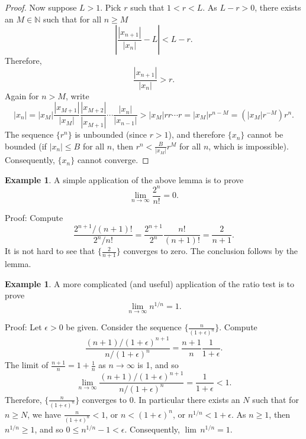 \documentclass[12pt]{book}
\newcommand{\abs}[1]{\left\lvert {#1} \right\rvert}
\newcommand{\N}{{\mathbb{N}}}
\theoremstyle{plain}
\theoremstyle{remark}
\theoremstyle{definition}
\theoremstyle{exercise}
\theoremstyle{example}
\newtheorem{example}[thm]{Example}
\begin{document}
\begin{proof}
Now suppose $L > 1$.  Pick
$r$ such that $1 < r < L$.  As $L-r > 0$,
there exists an $M \in \N$ such that for
all $n \geq M$
\begin{equation*}
\abs{\frac{\abs{x_{n+1}}}{\abs{x_n}} - L} < L-r .
\end{equation*}
Therefore,
\begin{equation*}
\frac{\abs{x_{n+1}}}{\abs{x_n}} > r .
\end{equation*}
Again for $n > M$,
write
\begin{equation*}
\abs{x_n} =
\abs{x_M}
\frac{\abs{x_{M+1}}}{\abs{x_{M}}}
\frac{\abs{x_{M+2}}}{\abs{x_{M+1}}}
\cdots
\frac{\abs{x_{n}}}{\abs{x_{n-1}}}
>
\abs{x_M}
r r \cdots r = \abs{x_M} r^{n-M} = (\abs{x_M} r^{-M}) r^n .
\end{equation*}
The sequence $\{ r^n \}$ is unbounded (since $r > 1$), and therefore
$\{x_n\}$ cannot be bounded (if $\abs{x_n} \leq B$ for all $n$, then
$r^n < \frac{B}{\abs{x_M}} r^{M}$ for all $n$, which is impossible).
Consequently, $\{ x_n \}$ cannot converge.
\end{proof}

\begin{example}
A simple application of the above lemma is to prove 
\begin{equation*}
\lim_{n\to\infty} \frac{2^n}{n!} = 0 .
\end{equation*}

Proof:
Compute
\begin{equation*}
\frac{2^{n+1} / (n+1)!}{2^n/n!}
=
\frac{2^{n+1}}{2^n}\frac{n!}{(n+1)!}
=
\frac{2}{n+1} .
\end{equation*}
It is not hard to see that $\{ \frac{2}{n+1} \}$ converges to zero.
The conclusion follows by the lemma.
\end{example}

\begin{example} \label{example:nto1overn}
A more complicated (and useful) application of the ratio test is to prove 
\begin{equation*}
\lim_{n\to\infty} n^{1/n} = 1 .
\end{equation*}

Proof:
Let $\epsilon > 0$ be given.  Consider the sequence
$\bigl\{ \frac{n}{{(1+\epsilon)}^n} \bigr\}$.  Compute
\begin{equation*}
\frac{(n+1)/{(1+\epsilon)}^{n+1}}{n/{(1+\epsilon)}^{n}}
=
\frac{n+1}{n} \frac{1}{1+\epsilon} .
\end{equation*}
The limit of $\frac{n+1}{n} = 1+\frac{1}{n}$ as $n \to \infty$ is 1, and so
\begin{equation*}
\lim_{n\to \infty} \frac{(n+1)/{(1+\epsilon)}^{n+1}}{n/{(1+\epsilon)}^{n}}
=
\frac{1}{1+\epsilon}  < 1 .
\end{equation*}
Therefore, $\bigl \{ \frac{n}{{(1+\epsilon)}^n} \bigr\}$ converges to 0.
In particular
there exists an $N$ such that for $n \geq N$, we have
$\frac{n}{{(1+\epsilon)}^n} < 1$, or 
$n < {(1+\epsilon)}^n$, or 
$n^{1/n} < 1+\epsilon$.  As $n \geq 1$, then $n^{1/n} \geq 1$, and
so $0 \leq n^{1/n}-1 < \epsilon$. Consequently,
$\lim\, n^{1/n} = 1$.
\end{example}
\end{document}
